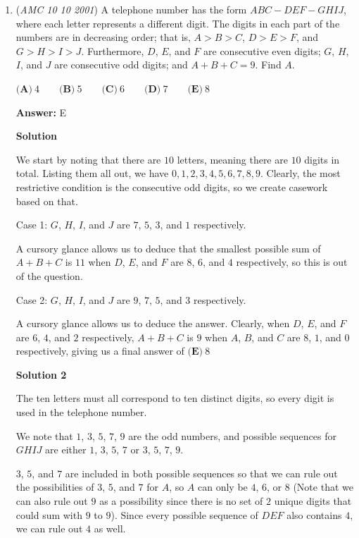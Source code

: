 \begin{enumerate}
 


	\item (\textit{AMC 10 10 2001}) A telephone number has the form $ABC - DEF - GHIJ$, where each letter represents a different digit. The digits in each part of the numbers are in decreasing order; that is, $A > B > C$, $D > E > F$, and $G > H > I > J$. Furthermore, $D$, $E$, and $F$ are consecutive even digits; $G$, $H$, $I$, and $J$ are consecutive odd digits; and $A + B + C = 9$. Find $A$.


 $\textbf{(A)} \ 4 \qquad \textbf{(B)} \ 5 \qquad \textbf{(C)} \ 6 \qquad \textbf{(D)} \ 7 \qquad \textbf{(E)} \ 8$

 \textbf{Answer: }E



\textbf{Solution}

We start by noting that there are $10$ letters, meaning there are $10$ digits in total. Listing them all out, we have $0, 1, 2, 3, 4, 5, 6, 7, 8, 9$. Clearly, the most restrictive condition is the consecutive odd digits, so we create casework based on that.

 Case 1: $G$, $H$, $I$, and $J$ are $7$, $5$, $3$, and $1$ respectively. 

 A cursory glance allows us to deduce that the smallest possible sum of $A + B + C$ is $11$ when $D$, $E$, and $F$ are $8$, $6$, and $4$ respectively, so this is out of the question.

 Case 2: $G$, $H$, $I$, and $J$ are $9$, $7$, $5$, and $3$ respectively. 

 A cursory glance allows us to deduce the answer. Clearly, when $D$, $E$, and $F$ are $6$, $4$, and $2$ respectively, $A + B + C$ is $9$ when $A$, $B$, and $C$ are $8$, $1$, and $0$ respectively, giving us a final answer of $\boxed{\textbf{(E)}\ 8}$




\textbf{Solution 2}

The ten letters must all correspond to ten distinct digits, so every digit is used in the telephone number.

 We note that $1$, $3$, $5$, $7$, $9$ are the odd numbers, and possible sequences for $GHIJ$ are either $1$, $3$, $5$, $7$ or $3$, $5$, $7$, $9$.

 $3$, $5$, and $7$ are included in both possible sequences so that we can rule out the possibilities of $3$, $5$, and $7$ for $A$, so $A$ can only be $4$, $6$, or $8$ (Note that we can also rule out $9$ as a possibility since there is no set of $2$ unique digits that could sum with $9$ to $9$). Since every possible sequence of $DEF$ also contains $4$, we can rule out $4$ as well.


\end{enumerate}

